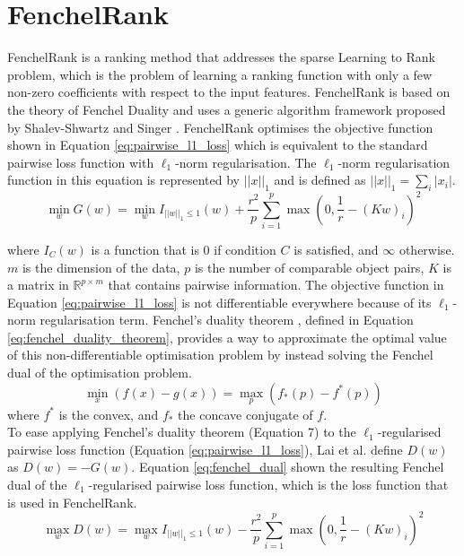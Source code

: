 \section{FenchelRank}
FenchelRank \cite{Lai2013} is a ranking method that addresses the sparse Learning to Rank problem, which is the problem of learning a ranking function with only a few non-zero coefficients with respect to the input features. FenchelRank is based on the theory of Fenchel Duality \cite{Rifkin2007} and uses a generic algorithm framework proposed by Shalev-Shwartz and Singer \cite{Shalev-Shwartz2010}. FenchelRank optimises the objective function shown in Equation \ref{eq:pairwise_l1_loss} which is equivalent to the standard pairwise loss function with $\ell_1$-norm regularisation. The $\ell_1$-norm regularisation function in this equation is represented by $||x||_1$ and is defined as $||x||_1=\sum\nolimits_i|x_i|$.
\begin{equation}
\min_w G(w) = \min_w I_{||w||_{1} \le 1}(w) + \frac{r^2}{p} \sum\limits_{i=1}^{p}\max(0,\frac{1}{r}-(Kw)_i)^2
\label{eq:pairwise_l1_loss}
\end{equation}

\noindent where $I_{C}(w)$ is a function that is 0 if condition $C$ is satisfied, and $\infty$ otherwise. $m$ is the dimension of the data, $p$ is the number of comparable object pairs, $K$ is a matrix in $\mathbb{R}^{p \times m}$ that contains pairwise information. The objective function in Equation \ref{eq:pairwise_l1_loss} is not differentiable everywhere because of its $\ell_1$-norm regularisation term. Fenchel's duality theorem \cite{Rifkin2007}, defined in Equation \ref{eq:fenchel_duality_theorem}, provides a way to approximate the optimal value of this non-differentiable optimisation problem by instead solving the Fenchel dual of the optimisation problem.
\begin{equation}
\min_x(f(x)-g(x)) = \max_p(f_*(p)-f^*(p))
\label{eq:fenchel_duality_theorem}
\end{equation}
\noindent where $f^*$ is the convex, and $f_*$ the concave conjugate of $f$.\\

To ease applying Fenchel's duality theorem (Equation 7) to the $\ell_1$-regularised pairwise loss function (Equation \ref{eq:pairwise_l1_loss}), Lai et al. define $D(w)$ as $D(w) = -G(w)$. Equation \ref{eq:fenchel_dual} shown the resulting Fenchel dual of the $\ell_1$-regularised pairwise loss function, which is the loss function that is used in FenchelRank.
\begin{equation}
\max_w D(w) = \max_w I_{||w||_{1} \le 1}(w) - \frac{r^2}{p} \sum\limits_{i=1}^{p}\max(0,\frac{1}{r}-(Kw)_i)^2
\label{eq:fenchel_dual}
\end{equation}

